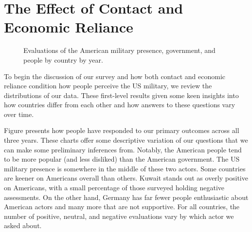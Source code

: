 \section*{The Effect of Contact and Economic Reliance}


\begin{figure}[t]
	\centering{}
	\caption{Evaluations of the American military presence, government, and people by country by year.}
	\label{fig:dvdesc}
\end{figure} %

To begin the discussion of our survey and how both contact and economic reliance condition how people perceive the US military, we review the distributions of our data. These first-level results given some keen insights into how countries differ from each other and how answers to these questions vary over time.	


Figure \label{fig:dvdesc} presents how people have responded to our primary outcomes across all three years. These charts offer some descriptive variation of our questions that we can make some preliminary inferences from. Notably, the American people tend to be more popular (and less disliked) than the American government. The US military presence is somewhere in the middle of these two actors. Some countries are keener on Americans overall than others. Kuwait stands out as overly positive on Americans, with a small percentage of those surveyed holding negative assessments. On the other hand, Germany has far fewer people enthusiastic about American actors and many more that are not supportive. For all countries, the number of positive, neutral, and negative evaluations vary by which actor we asked about. %


